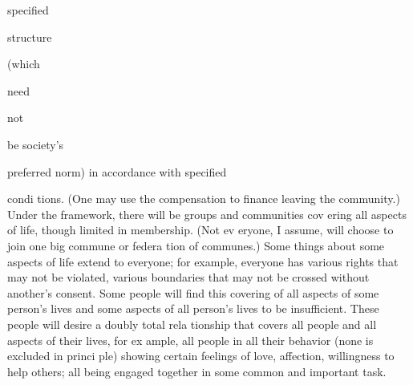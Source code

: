 \documentclass[11pt,openany]{book}
\begin{document}
specified 

structure 

(which 

need 

not 

be society's 

preferred norm) in accordance with specified 

condi tions. (One may use the compensation to finance leaving the community.) Under the framework, there will be groups and communities cov ering all aspects of life, though limited in membership. (Not ev eryone, I assume, will choose to join one big commune or federa tion of communes.) Some things about some aspects of life extend to everyone; for example, everyone has various rights that may not be violated, various boundaries that may not be crossed without another's consent. Some people will find this covering of all aspects of some person's lives and some aspects of all person's lives to be insufficient. These people will desire a doubly total rela tionship that covers all people and all aspects of their lives, for ex ample, all people in all their behavior (none is excluded in princi ple) showing certain feelings of love, affection, willingness to help others; all being engaged together in some common and important task. 
\end{document}
